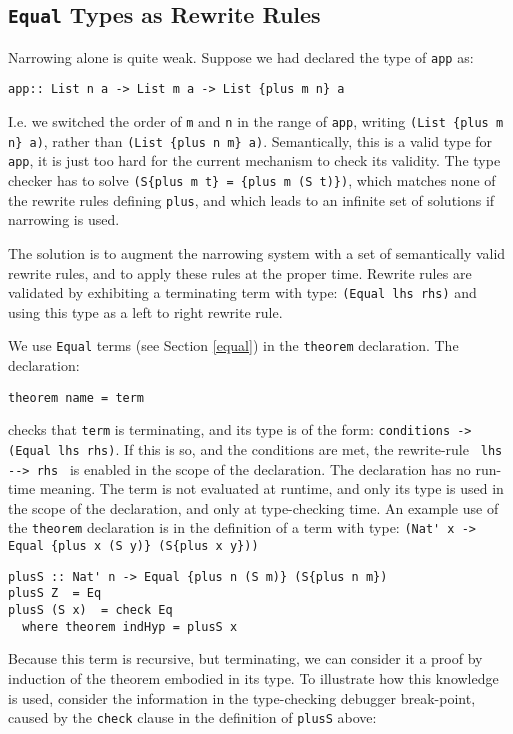 \documentclass[11pt,twoside]{article}
\begin{document}
\subsection{{\tt Equal} Types as Rewrite Rules}\label{rewrite}

Narrowing alone is quite weak. Suppose we
had declared the type of {\tt app} as:
\begin{verbatim}
app:: List n a -> List m a -> List {plus m n} a
\end{verbatim}

I.e. we switched the order of {\tt m} and {\tt n} in the range of {\tt app},
writing \verb+(List {plus m n} a)+, rather than \verb+(List {plus n m} a)+.
Semantically, this is a valid type for {\tt app}, it is just too hard for the
current mechanism to check its validity. The type checker
has to solve {\tt (S\{plus m t\} = \{plus m (S t)\})}, which matches none of the
rewrite rules defining {\tt plus}, and which leads to an infinite set of solutions
if narrowing is used.

The solution is to augment the narrowing system with a set of semantically valid
rewrite rules, and to apply these rules at the proper time. Rewrite rules are
validated by exhibiting a terminating term with type: \verb+(Equal lhs rhs)+ and using
this type as a left to right rewrite rule.

We use {\tt Equal} terms (see Section \ref{equal}) in the {\tt theorem} declaration. The declaration:

\begin{verbatim}
theorem name = term
\end{verbatim}
checks that {\tt term} is terminating, and its type is of the form:
{\tt conditions -> (Equal lhs rhs)}.
If this is so, and the conditions are met, the rewrite-rule \verb+ lhs --> rhs + is enabled
in the scope of the declaration. The declaration has no run-time meaning.
The term is not evaluated at runtime, and only its type is used
in the scope of the declaration, and only at type-checking time. An example use of the {\tt theorem} declaration
is in the definition of a term with type: \verb+(Nat' x -> Equal {plus x (S y)} (S{plus x y}))+
\begin{verbatim}
plusS :: Nat' n -> Equal {plus n (S m)} (S{plus n m})
plusS Z  = Eq
plusS (S x)  = check Eq
  where theorem indHyp = plusS x
\end{verbatim}
Because this term is recursive, but terminating, we can consider it
a proof by induction of the theorem embodied in its type.
To illustrate how this knowledge is used, consider the information
in the type-checking debugger break-point, caused by the {\tt check} clause in
the definition of {\tt plusS} above:
\end{document}

